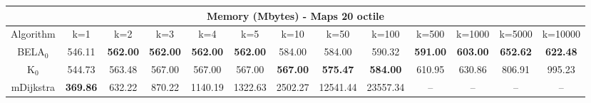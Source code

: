 \begin{tabular}{c|cccccccccccc}\toprule
\multicolumn{13}{c}{Memory (Mbytes) - Maps 20 octile}\\ \midrule
Algorithm & k=1 & k=2 & k=3 & k=4 & k=5 & k=10 & k=50 & k=100 & k=500 & k=1000 & k=5000 & k=10000 \\ \midrule
BELA$_0$ & 546.11 & \textbf{562.00} & \textbf{562.00} & \textbf{562.00} & \textbf{562.00} & 584.00 & 584.00 & 590.32 & \textbf{591.00} & \textbf{603.00} & \textbf{652.62} & \textbf{622.48} \\
K$_0$ & 544.73 & 563.48 & 567.00 & 567.00 & 567.00 & \textbf{567.00} & \textbf{575.47} & \textbf{584.00} & 610.95 & 630.86 & 806.91 & 995.23 \\
mDijkstra & \textbf{369.86} & 632.22 & 870.22 & 1140.19 & 1322.63 & 2502.27 & 12541.44 & 23557.34 & -- & -- & -- & -- \\ \bottomrule 
\end{tabular}
